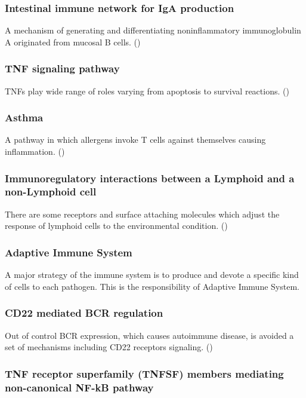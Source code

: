 \documentclass[3p,authoryear,preprint,12pt]{elsarticle}
\begin{document}
\subsubsection{Intestinal immune network for IgA production}
A mechanism of generating and differentiating noninflammatory immunoglobulin A originated from mucosal B cells. (\cite{KEGG  IINIP})

\subsubsection{TNF signaling pathway}
TNFs play wide range of roles varying from apoptosis to survival reactions. (\cite{KEGG TNF sig})

\subsubsection{Asthma}
A pathway in which allergens invoke T cells against themselves causing inflammation. (\cite{KEGG Athma})

\subsubsection{Immunoregulatory interactions between a Lymphoid and a non-Lymphoid cell}
There are some receptors and surface attaching molecules which adjust the response of lymphoid cells to the environmental condition. (\cite{Reactome IIbLnL})

\subsubsection{Adaptive Immune System}
A major strategy of the immune system is to produce and devote a specific kind of cells to each pathogen. This is the responsibility of Adaptive Immune System.

\subsubsection{CD22 mediated BCR regulation}
Out of control BCR expression, which causes autoimmune disease, is avoided a set of mechanisms including CD22 receptors signaling. (\cite{Reactome CD22 BCR R})

\subsubsection{TNF receptor superfamily (TNFSF) members mediating non-canonical NF-kB pathway}
\end{document}

